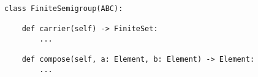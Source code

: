 \begin{verbatim}
class FiniteSemigroup(ABC):

    def carrier(self) -> FiniteSet:
        ...

    def compose(self, a: Element, b: Element) -> Element:
        ...
\end{verbatim}